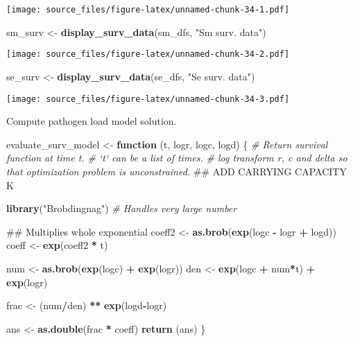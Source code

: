 \documentclass[]{article}
\newenvironment{Shaded}{\begin{snugshade}}{\end{snugshade}}
\newcommand{\KeywordTok}[1]{\textcolor[rgb]{0.13,0.29,0.53}{\textbf{#1}}}
\newcommand{\StringTok}[1]{\textcolor[rgb]{0.31,0.60,0.02}{#1}}
\newcommand{\CommentTok}[1]{\textcolor[rgb]{0.56,0.35,0.01}{\textit{#1}}}
\newcommand{\ControlFlowTok}[1]{\textcolor[rgb]{0.13,0.29,0.53}{\textbf{#1}}}
\newcommand{\OperatorTok}[1]{\textcolor[rgb]{0.81,0.36,0.00}{\textbf{#1}}}
\newcommand{\NormalTok}[1]{#1}
\begin{document}
\texttt{[image: source\_files/figure-latex/unnamed-chunk-34-1.pdf]}

\begin{Shaded}
\begin{Highlighting}[]
\NormalTok{sm_surv <-}\StringTok{ }\KeywordTok{display_surv_data}\NormalTok{(sm_dfs, }\StringTok{"Sm surv. data"}\NormalTok{)}
\end{Highlighting}
\end{Shaded}

\texttt{[image: source\_files/figure-latex/unnamed-chunk-34-2.pdf]}

\begin{Shaded}
\begin{Highlighting}[]
\NormalTok{se_surv <-}\StringTok{ }\KeywordTok{display_surv_data}\NormalTok{(se_dfs, }\StringTok{"Se surv. data"}\NormalTok{)}
\end{Highlighting}
\end{Shaded}

\texttt{[image: source\_files/figure-latex/unnamed-chunk-34-3.pdf]}

Compute pathogen load model solution.

\begin{Shaded}
\begin{Highlighting}[]
\NormalTok{evaluate_surv_model <-}\StringTok{ }\ControlFlowTok{function}\NormalTok{ (t, logr, logc, logd) \{}
  \CommentTok{# Return survival function at time t.}
  \CommentTok{# `t` can be a list of times.}
  \CommentTok{# log transform r, c and delta so that optimization problem is unconstrained.}
\NormalTok{  ## ADD CARRYING CAPACITY K}
  
  \KeywordTok{library}\NormalTok{(}\StringTok{"Brobdingnag"}\NormalTok{)  }\CommentTok{# Handles very large number}
  
\NormalTok{  ## Multiplies whole exponential}
\NormalTok{  coeff2 <-}\StringTok{ }\KeywordTok{as.brob}\NormalTok{(}\KeywordTok{exp}\NormalTok{(logc }\OperatorTok{-}\StringTok{ }\NormalTok{logr }\OperatorTok{+}\StringTok{ }\NormalTok{logd))}
\NormalTok{  coeff <-}\StringTok{ }\KeywordTok{exp}\NormalTok{(coeff2 }\OperatorTok{*}\StringTok{ }\NormalTok{t)}
  
\NormalTok{  num <-}\StringTok{ }\KeywordTok{as.brob}\NormalTok{(}\KeywordTok{exp}\NormalTok{(logc) }\OperatorTok{+}\StringTok{ }\KeywordTok{exp}\NormalTok{(logr))}
\NormalTok{  den <-}\StringTok{ }\KeywordTok{exp}\NormalTok{(logc }\OperatorTok{+}\StringTok{ }\NormalTok{num}\OperatorTok{*}\NormalTok{t) }\OperatorTok{+}\StringTok{ }\KeywordTok{exp}\NormalTok{(logr)}
  
\NormalTok{  frac <-}\StringTok{ }\NormalTok{(num}\OperatorTok{/}\NormalTok{den) }\OperatorTok{**}\StringTok{ }\KeywordTok{exp}\NormalTok{(logd}\OperatorTok{-}\NormalTok{logr)}
  
\NormalTok{  ans <-}\StringTok{ }\KeywordTok{as.double}\NormalTok{(frac }\OperatorTok{*}\StringTok{ }\NormalTok{coeff)}
  \KeywordTok{return}\NormalTok{ (ans)}
\NormalTok{\}}
\end{Highlighting}
\end{Shaded}
\end{document}
